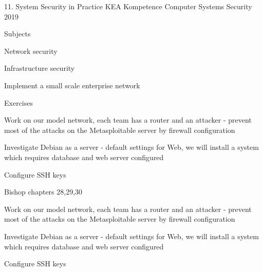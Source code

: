 \documentclass[Screen16to9,17pt]{foils}
\begin{document}
\mytitlepage
{11. System Security in Practice}
{KEA Kompetence Computer Systems Security 2019}



\begin{list1}
\item Subjects
\begin{list2}
\item Network security
\item Infrastructure security
\item Implement a small scale enterprise network
\end{list2}
\item Exercises
\begin{list2}
\item Work on our model network, each team has a router and an attacker - prevent most of the attacks on the Metasploitable server by firewall configuration
\item Investigate Debian as a server - default settings for Web, we will install a system which requires database and web server configured
\item Configure SSH keys
\end{list2}
\end{list1}




\begin{list1}
\item Bishop chapters 28,29,30
\end{list1}









\begin{list1}
\item Work on our model network, each team has a router and an attacker - prevent most of the attacks on the Metasploitable server by firewall configuration
\item Investigate Debian as a server - default settings for Web, we will install a system which requires database and web server configured
\item Configure SSH keys
\end{list1}



\slidenext
\end{document}
